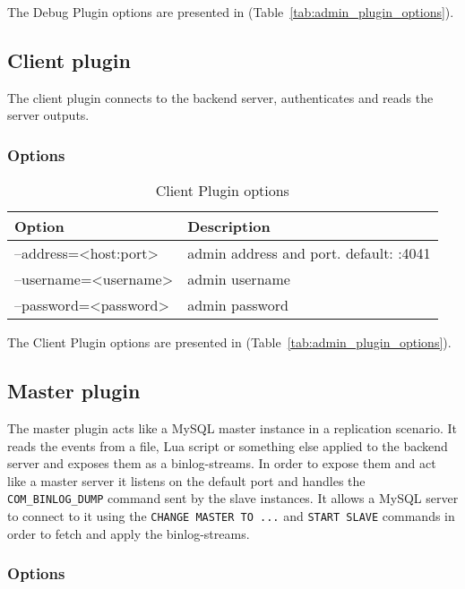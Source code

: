 The Debug Plugin options are presented in (Table~\ref{tab:admin_plugin_options}).


\subsection{Client plugin}


The client plugin connects to the backend server, authenticates and reads the server outputs. 

\subsubsection{Options}

\begin{table}[h!]
\centering
    \begin{tabular}{ | l | l |}
    \hline
    Option & Description \\ \hline
	--address=<host:port> & admin address and port. default: :4041 \\ \hline
    --username=<username> & admin username \\ \hline
	--password=<password>  & admin password \\ \hline
    \end{tabular}

\caption{Client Plugin options}
\label{tab:client_plugin_options}
\end{table}

The Client Plugin options are presented in (Table~\ref{tab:admin_plugin_options}).


\subsection{Master plugin}

The master plugin acts like a MySQL master instance in a replication scenario. It reads the events from a file, Lua script or something else applied to the backend server and exposes them as a binlog-streams. In order to expose them and act like a master server it listens on the default port and handles the \texttt{COM\_BINLOG\_DUMP} command sent by the slave instances. It allows a MySQL server to connect to it using the \texttt{CHANGE MASTER TO ...} and \texttt{START SLAVE} commands in order to fetch and apply the binlog-streams. 

\subsubsection{Options}

